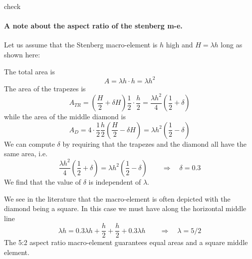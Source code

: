 check \cite{nath93}

\paragraph{A note about the aspect ratio of the stenberg m-e.}
Let us assume that the Stenberg macro-element is $h$ high and $H=\lambda h$ long
as shown here:

\begin{center}
\end{center}

The total area is 
\[
A= \lambda h \cdot h = \lambda h^2
\]
The area of the trapezes is
\[
A_{TR} = (\frac{H}{2} + \delta H)\frac12 \cdot \frac{h}{2}=\frac{\lambda h^2}{4} \left(\frac12 + \delta \right)
\]
while the area of the middle diamond is
\[
A_D = 4 \cdot \frac12 \frac{h}{2} \left(\frac{H}{2}-\delta H \right) 
= \lambda h^2 \left(\frac12 - \delta \right)
\]
We can compute $\delta$ by requiring that the trapezes and the diamond all 
have the same area, i.e.
\[
\frac{\lambda h^2}{4} (\frac12 + \delta)
=
\lambda h^2 (\frac12 - \delta)
\qquad
\Rightarrow \quad \delta = 0.3
\]
We find that the value of $\delta$ is independent of $\lambda$.

We see in the literature \cite{sten84,brfo,chba93}  that the 
macro-element is often depicted with the diamond being a square.
In this case we must have along the horizontal middle line
\[
\lambda h = 0.3 \lambda h + \frac{h}{2}+ \frac{h}{2} + 0.3 \lambda h
\qquad
\Rightarrow \quad 
\lambda=5/2
\]
The 5:2 aspect ratio macro-element guarantees equal areas and a square middle element.

